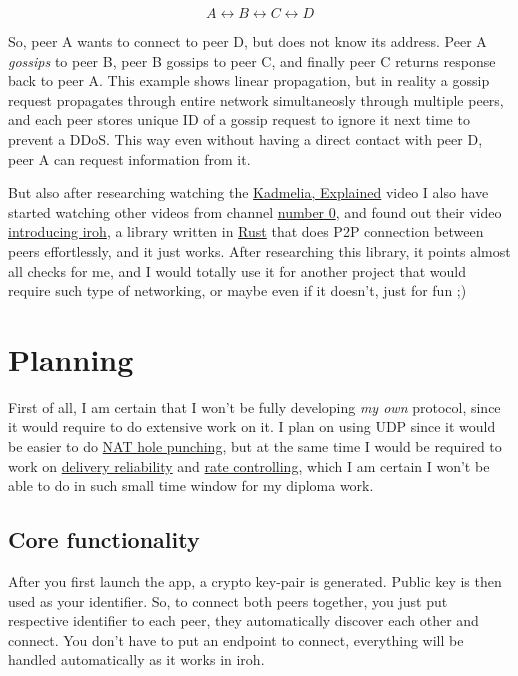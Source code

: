 \documentclass[a4paper]{article}
\begin{document}
$$ A \leftrightarrow B \leftrightarrow C \leftrightarrow D $$

So, peer A wants to connect to peer D, but does not know its address.
Peer A \emph{gossips} to peer B, peer B gossips to peer C, and finally peer C returns
response back to peer A. This example shows linear propagation, but in reality a gossip request
propagates through entire network simultaneosly through multiple peers, and each peer stores unique ID
of a gossip request to ignore it next time to prevent a DDoS. This way even without having a direct contact
with peer D, peer A can request information from it.

But also after researching watching the \href{https://www.youtube.com/watch?v=1QdKhNpsj8M}{Kadmelia, Explained} video
I also have started watching other videos from channel \href{https://www.youtube.com/channel/UCdWMU1dBMmB4SrMokGI4jvA}{number 0},
and found out their video \href{https://www.youtube.com/watch?v=RwAt36Xe3UI}{introducing iroh},
a library written in \href{https://rust-lang.org/}{Rust} that does P2P connection between peers effortlessly,
and it just works. After researching this library, it points almost all checks for me, and I would totally use it
for another project that would require such type of networking, or maybe even if it doesn't, just for fun ;)


\section{Planning} \label{planning}

First of all, I am certain that I won't be fully developing \emph{my own} protocol,
since it would require to do extensive work on it.
I plan on using UDP since it would be easier to do \href{https://en.wikipedia.org/wiki/UDP_hole_punching}{NAT hole punching},
but at the same time I would be required to work on
\href{https://www.reddit.com/r/networking/comments/a8c42z/}{delivery reliability}
and \href{https://en.wikipedia.org/wiki/Network_congestion#Congestion_control}{rate controlling},
which I am certain I won't be able to do in such small time window for my diploma work.

\subsection{Core functionality} \label{corefunctionality}

After you first launch the app, a crypto key-pair is generated.
Public key is then used as your identifier.
So, to connect both peers together, you just put respective identifier to each peer,
they automatically discover each other and connect. You don't have to put an endpoint to connect,
everything will be handled automatically as it works in iroh.
\end{document}
